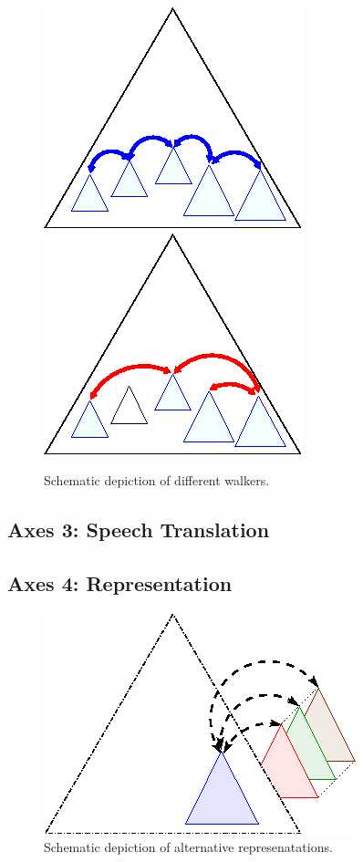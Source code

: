 \documentclass{sig-alternate}
\begin{document}
\begin{figure}[h!]
  \begin{center}
    \leavevmode
    \includegraphics[width=.4\columnwidth]{images/walker1}
    \includegraphics[width=.4\columnwidth]{images/walker2}
    \caption{Schematic depiction of different walkers.}
    \label{fig:walkers}
  \end{center}
\end{figure}

\subsection{Axes 3: Speech Translation}
\label{sec:ax1}



\subsection{Axes 4: Representation}
\label{sec:ax1}


\begin{figure}[h!]
  \begin{center}
    \leavevmode
    \includegraphics[width=.5\columnwidth]{images/substructure1}
    \caption{Schematic depiction of alternative represenatations.}
    \label{fig:walkers}
  \end{center}
\end{figure}
\end{document}

